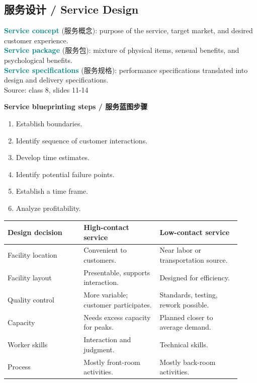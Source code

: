 \documentclass[10pt,a4paper]{ctexart}
\newcommand{\term}[2]{\textbf{\textcolor{Teal}{#1}} \textcolor{Muted}{(#2)}}
\newcommand{\source}[1]{\textcolor{Muted}{\footnotesize Source: #1}}
\begin{document}
\subsection{服务设计 / Service Design}
\label{subsec:service-design}

\term{Service concept}{服务概念}: purpose of the service, target market, and desired customer experience.\\
\term{Service package}{服务包}: mixture of physical items, sensual benefits, and psychological benefits.\\
\term{Service specifications}{服务规格}: performance specifications translated into design and delivery specifications.\\
\source{class 8, slides 11-14}

\textbf{Service blueprinting steps / 服务蓝图步骤}
\begin{enumerate}
  \item Establish boundaries.
  \item Identify sequence of customer interactions.
  \item Develop time estimates.
  \item Identify potential failure points.
  \item Establish a time frame.
  \item Analyze profitability.
\end{enumerate}

\begin{longtable}{@{}L{0.30\linewidth}L{0.30\linewidth}L{0.32\linewidth}@{}}
\toprule
\textbf{Design decision} & \textbf{High-contact service} & \textbf{Low-contact service} \\
\midrule
Facility location & Convenient to customers. & Near labor or transportation source. \\
Facility layout & Presentable, supports interaction. & Designed for efficiency. \\
Quality control & More variable; customer participates. & Standards, testing, rework possible. \\
Capacity & Needs excess capacity for peaks. & Planned closer to average demand. \\
Worker skills & Interaction and judgment. & Technical skills. \\
Process & Mostly front-room activities. & Mostly back-room activities. \\
\bottomrule
\end{longtable}
\end{document}
